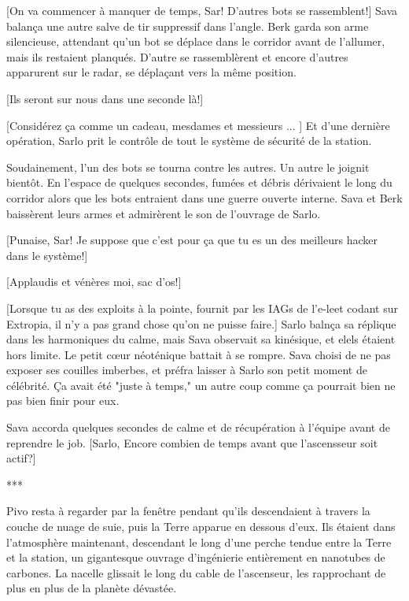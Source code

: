 [On va commencer à manquer de temps, Sar! D'autres bots se rassemblent!] Sava balança une autre salve de tir suppressif dans l'angle. Berk garda son arme silencieuse, attendant qu'un bot se déplace dans le corridor avant de l'allumer, mais ils restaient planqués. D'autre se rassemblèrent et encore d'autres apparurent sur le radar, se déplaçant vers la même position. 

[Ils seront sur nous dans une seconde là!] 

[Considérez ça comme un cadeau, mesdames et messieurs ... ] Et d'une dernière opération, Sarlo prit le contrôle de tout le système de sécurité de la station. 

Soudainement, l'un des bots se tourna contre les autres. Un autre le joignit bientôt. En l'espace de quelques secondes, fumées et débris dérivaient le long du corridor alors que les bots entraient dans une guerre ouverte interne. Sava et Berk baissèrent leurs armes et admirèrent le son de l'ouvrage de Sarlo. 

[Punaise, Sar! Je suppose que c'est pour ça que tu es un des meilleurs hacker dans le système!] 

[Applaudis et vénères moi, sac d'os!] 

[Lorsque tu as des exploits à la pointe, fournit par les IAGs de l'e-leet codant sur Extropia, il n'y a pas grand chose qu'on ne puisse faire.] Sarlo balnça sa réplique dans les harmoniques du calme, mais Sava observait sa kinésique, et elels étaient hors limite. Le petit cœur néoténique battait à se rompre. Sava choisi de ne pas exposer ses couilles imberbes, et préfra laisser à Sarlo son petit moment de célébrité. Ça avait été "juste à temps," un autre coup comme ça pourrait bien ne pas bien finir pour eux. 

Sava accorda quelques secondes de calme et de récupération à l'équipe avant de reprendre le job. [Sarlo, Encore combien de temps avant que l'ascensseur soit actif?] 

\begin{center} *** \end{center} 

Pivo resta à regarder par la fenêtre pendant qu'ils descendaient à travers la couche de nuage de suie, puis la Terre apparue en dessous d'eux. Ils étaient dans l'atmosphère maintenant, descendant le long d'une perche tendue entre la Terre et la station, un gigantesque ouvrage d'ingénierie entièrement en nanotubes de carbones. La nacelle glissait le long du cable de l'ascenseur, les rapprochant de plus en plus de la planète dévastée. 

